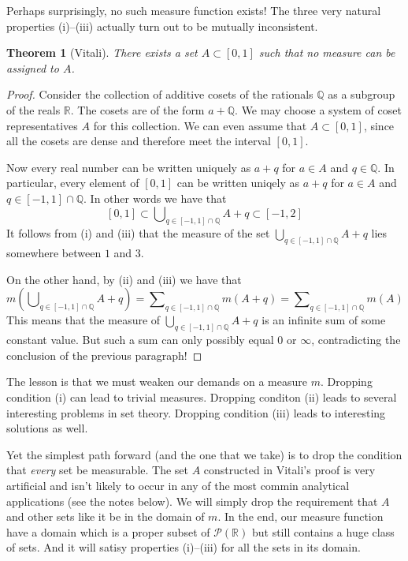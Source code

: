 \documentclass[11pt,oneside]{amsbook}
\newcommand{\QQ}{\mathbb Q}
\newcommand{\RR}{\mathbb R}
\theoremstyle{definition}
\theoremstyle{plain}
\newtheorem{thm}{Theorem}[section]
\theoremstyle{definition}
\theoremstyle{remark}
\numberwithin{equation}{section}
\numberwithin{figure}{section}
\begin{document}
Perhaps surprisingly, no such measure function exists! The three very natural properties (i)--(iii) actually turn out to be mutually inconsistent.

\begin{thm}[Vitali]
  There exists a set $A\subset[0,1]$ such that no measure can be assigned to $A$.
\end{thm}

\begin{proof}
  Consider the collection of additive cosets of the rationals $\QQ$ as a subgroup of the reals $\RR$. The cosets are of the form $a+\QQ$. We may choose a system of coset representatives $A$ for this collection. We can even assume that $A\subset[0,1]$, since all the cosets are dense and therefore meet the interval $[0,1]$.

  Now every real number can be written uniquely as $a+q$ for $a\in A$ and $q\in\QQ$. In particular, every element of $[0,1]$ can be written uniqely as $a+q$ for $a\in A$ and $q\in[-1,1]\cap\QQ$. In other words we have that
  \[[0,1]\subset\bigcup\nolimits_{q\in[-1,1]\cap\QQ}A+q\subset[-1,2]
  \]
  It follows from (i) and (iii) that the measure of the set $\bigcup_{q\in[-1,1]\cap\QQ}A+q$ lies somewhere between $1$ and $3$.

  On the other hand, by (ii) and (iii) we have that
  \[m(\bigcup\nolimits_{q\in[-1,1]\cap\QQ}A+q)
  =\sum\nolimits_{q\in[-1,1]\cap\QQ}m(A+q)=\sum\nolimits_{q\in[-1,1]\cap\QQ}m(A)
  \]
  This means that the measure of $\bigcup_{q\in[-1,1]\cap\QQ}A+q$ is an infinite sum of some constant value. But such a sum can only possibly equal $0$ or $\infty$, contradicting the conclusion of the previous paragraph!
\end{proof}

The lesson is that we must weaken our demands on a measure $m$. Dropping condition (i) can lead to trivial measures. Dropping conditon (ii) leads to several interesting problems in set theory. Dropping condition (iii) leads to interesting solutions as well.

Yet the simplest path forward (and the one that we take) is to drop the condition that \emph{every} set be measurable. The set $A$ constructed in Vitali's proof is very artificial and isn't likely to occur in any of the most commin analytical applications (see the notes below). We will simply drop the requirement that $A$ and other sets like it be in the domain of $m$. In the end, our measure function have a domain which is a proper subset of $\mathcal P(\RR)$ but still contains a huge class of sets. And it will satisy properties (i)--(iii) for all the sets in its domain.
\end{document}
